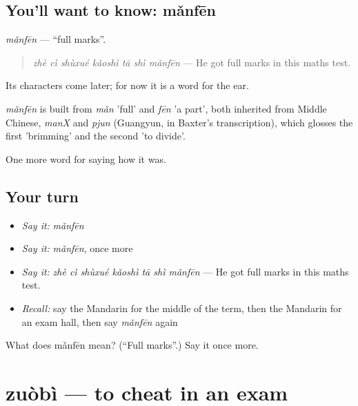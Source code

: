 \subsection*{You'll want to know: mǎnfēn}
\emph{mǎnfēn} — \textquotedblleft{}full marks\textquotedblright{}.

\begin{quote}
\emph{zhè cì shùxué kǎoshì tā shì mǎnfēn} — He got full marks in this maths test.
\end{quote}

Its characters come later; for now it is a word for the ear.

\begin{cousinweb}
\emph{mǎnfēn} is built from \emph{mǎn} 'full' and \emph{fēn} 'a part', both inherited from Middle Chinese, \emph{manX} and \emph{pjun} (Guangyun, in Baxter's transcription), which glosses the first 'brimming' and the second 'to divide'.
\end{cousinweb}

\begin{grammarlens}[title={What you've built}]
One more word for saying how it was.
\end{grammarlens}

\subsection*{Your turn}
\begin{itemize}
\raggedright
  \item \emph{Say it:} \emph{mǎnfēn}
  \item \emph{Say it:} \emph{mǎnfēn}, once more
  \item \emph{Say it:} \emph{zhè cì shùxué kǎoshì tā shì mǎnfēn} — He got full marks in this maths test.
  \item \emph{Recall:} say the Mandarin for the middle of the term, then the Mandarin for an exam hall, then say \emph{mǎnfēn} again
\end{itemize}

\begin{tcolorbox}[breakable,colback=teal!4,colframe=teal!35!black,title={Before you move on}]
What does mǎnfēn mean? (\textquotedblleft{}Full marks\textquotedblright{}.) Say it once more.
\end{tcolorbox}
\section[zuòbì]{zuòbì — to cheat in an exam}

